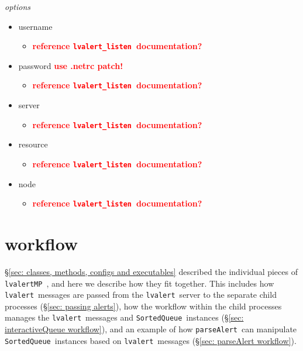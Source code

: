 \documentclass{article}
\newcommand{\FIXME}[1]{\textcolor{red}{\textbf{#1}}}
\newcommand{\alert}{\texttt{lvalert}~}
\newcommand{\lvalertListen}{\texttt{lvalert\_listen}~}
\newcommand{\lvalertMP}{\texttt{lvalertMP}~}
\newcommand{\parseAlert}{\texttt{parseAlert}~}
\newcommand{\SortedQueue}{\texttt{SortedQueue}~}
\begin{document}
\noindent
\textit{options}

\begin{itemize}
    \item{username
        \begin{itemize}
            \item{\FIXME{reference \lvalertListen documentation?}}
        \end{itemize}
         }
    \item{password \FIXME{use .netrc patch!}
        \begin{itemize}
            \item{\FIXME{reference \lvalertListen documentation?}}
        \end{itemize}
         }
    \item{server
        \begin{itemize}
            \item{\FIXME{reference \lvalertListen documentation?}}
        \end{itemize}
         }
    \item{resource
        \begin{itemize}
            \item{\FIXME{reference \lvalertListen documentation?}}
        \end{itemize}
         }
    \item{node
        \begin{itemize}
            \item{\FIXME{reference \lvalertListen documentation?}}
        \end{itemize}
         }
\end{itemize}


\section{workflow}
\label{sec: workflow}

\S\ref{sec: classes, methods, configs and executables} described the individual pieces of \lvalertMP, and here we describe how they fit together.
This includes how \alert messages are passed from the \alert server to the separate child processes (\S\ref{sec: passing alerts}), how the workflow within the child processes manages the \alert messages and \SortedQueue instances (\S\ref{sec: interactiveQueue workflow}), and an example of how \parseAlert can manipulate \SortedQueue instances based on \alert messages (\S\ref{sec: parseAlert workflow}).
\end{document}

